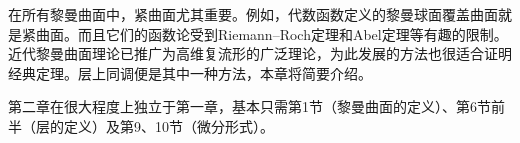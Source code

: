 在所有黎曼曲面中，紧曲面尤其重要。例如，代数函数定义的黎曼球面覆盖曲面就是紧曲面。而且它们的函数论受到Riemann--Roch定理和Abel定理等有趣的限制。近代黎曼曲面理论已推广为高维复流形的广泛理论，为此发展的方法也很适合证明经典定理。层上同调便是其中一种方法，本章将简要介绍。

第二章在很大程度上独立于第一章，基本只需第1节（黎曼曲面的定义）、第6节前半（层的定义）及第9、10节（微分形式）。
